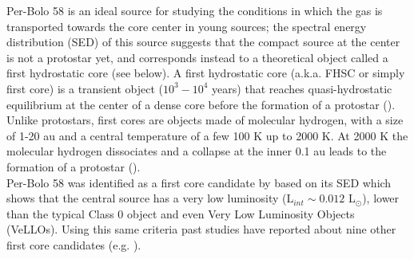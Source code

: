 \documentclass[iop]{emulateapj}
\begin{document}
Per-Bolo 58 is an ideal source for studying the conditions in which the gas is transported towards the core center in young sources; the spectral energy distribution (SED) of this source suggests that the compact source at the center is not a protostar yet, and corresponds instead to a theoretical object called a first hydrostatic core (see below). A first hydrostatic core (a.k.a. FHSC or simply first core) is a transient object ($10^{3}-10^{4}$ years) that reaches quasi-hydrostatic equilibrium at the center of a dense core before the formation of a protostar (\citealt{1969LarsonNumerical}). Unlike protostars, first cores are objects made of molecular hydrogen, with a size of  1-20 au and a central temperature of a few 100 K up to 2000 K. At 2000 K the molecular hydrogen dissociates and a collapse at the inner 0.1 au leads to the formation of a protostar (\citealt{1969LarsonNumerical,1998Masunaga,2006SaigoEvolution,2011MatsumotoProtostellar,2012JoosProtostellar,2013TomidaRadiation,2014BateCollapse,2015TomidaRadiation}). \\


Per-Bolo 58 was identified as a first core candidate by \cite{2010EnochCandidate} based on its SED which shows that the central source has a very low luminosity (L$_{int}\sim0.012$ L$_{\odot}$), lower than the typical Class 0 object and even Very Low Luminosity Objects (VeLLOs). Using this same criteria past studies have reported about nine other first core candidates (e.g. \citealt{2006BellocheEvolutionary,2010ChenL1448,2010EnochCandidate,2011DunhamDetection,2011PinedaEnigmatic,2012ChenSubmillimeter,2012SchneeHow,2012PezzutoHerschel, 2013HuangProbing, 2013MurilloDisentangling}).
\end{document}
